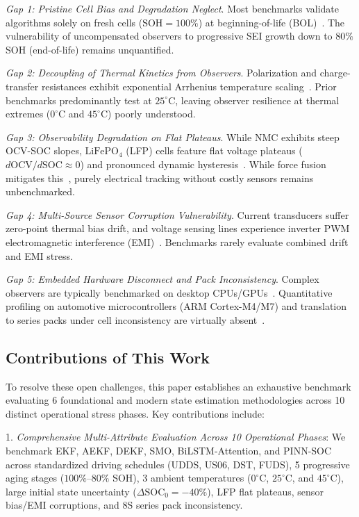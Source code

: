 \documentclass[balance,nocopyright,upint,varvw,hyphenate,barcolor=NavyBlue,nolists]{asmejour}
\begin{document}
\emph{Gap 1: Pristine Cell Bias and Degradation Neglect}. Most benchmarks validate algorithms solely on fresh cells ($\text{SOH} = 100\%$) at beginning-of-life (BOL)~\cite{Hu2012ecm,Chemali2018dnn,Le2026charging}. The vulnerability of uncompensated observers to progressive SEI growth down to $80\%$ SOH (end-of-life) remains unquantified.

\emph{Gap 2: Decoupling of Thermal Kinetics from Observers}. Polarization and charge-transfer resistances exhibit exponential Arrhenius temperature scaling~\cite{He2011ecm,Ren2019aging}. Prior benchmarks predominantly test at $25^\circ\text{C}$, leaving observer resilience at thermal extremes ($0^\circ\text{C}$ and $45^\circ\text{C}$) poorly understood.

\emph{Gap 3: Observability Degradation on Flat Plateaus}. While NMC exhibits steep OCV-SOC slopes, $\text{LiFePO}_4$ (LFP) cells feature flat voltage plateaus ($d\text{OCV}/d\text{SOC} \approx 0$) and pronounced dynamic hysteresis~\cite{Roscher2011hysteresis,Verbrugge2004hysteresis,Theiler2024hysteresis}. While force fusion mitigates this~\cite{Tian2025}, purely electrical tracking without costly sensors remains unbenchmarked.

\emph{Gap 4: Multi-Source Sensor Corruption Vulnerability}. Current transducers suffer zero-point thermal bias drift, and voltage sensing lines experience inverter PWM electromagnetic interference (EMI)~\cite{Hashemi2020,Zheng2018inconsistency}. Benchmarks rarely evaluate combined drift and EMI stress.

\emph{Gap 5: Embedded Hardware Disconnect and Pack Inconsistency}. Complex observers are typically benchmarked on desktop CPUs/GPUs~\cite{Song2019bilstm,Bhattacharya2024gpr}. Quantitative profiling on automotive microcontrollers (ARM Cortex-M4/M7) and translation to series packs under cell inconsistency are virtually absent~\cite{Yang2024degradation,Zheng2018inconsistency}.

\subsection{Contributions of This Work}
To resolve these open challenges, this paper establishes an exhaustive benchmark evaluating 6 foundational and modern state estimation methodologies across 10 distinct operational stress phases. Key contributions include:

1. \emph{Comprehensive Multi-Attribute Evaluation Across 10 Operational Phases}: We benchmark EKF, AEKF, DEKF, SMO, BiLSTM-Attention, and PINN-SOC across standardized driving schedules (UDDS, US06, DST, FUDS), 5 progressive aging stages ($100\%\text{--}80\%$ SOH), 3 ambient temperatures ($0^\circ\text{C}$, $25^\circ\text{C}$, and $45^\circ\text{C}$), large initial state uncertainty ($\Delta\text{SOC}_0 = -40\%$), LFP flat plateaus, sensor bias/EMI corruptions, and 8S series pack inconsistency.
\end{document}
